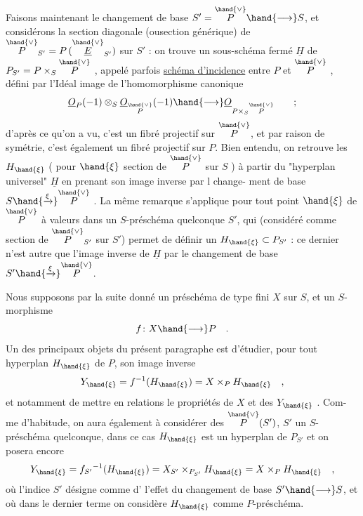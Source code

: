 
Faisons maintenant le changement de base $S'=\overset{\hand{\vee}}{P}\hand{\longrightarrow} S$, et considérons
la section diagonale (ousection générique) de $\overset{\hand{\vee}}{P}_{S'} = P\,(\overset{\hand{\vee}}{\underline{E}}_{S'})$ sur $S'$ :
on trouve un sous-schéma fermé $\underline{H}$ de $P_{S'} = P\times_S\overset{\hand{\vee}}{P}$ , appelé parfois
\uline{schéma d'incidence} entre $P$ et $\overset{\hand{\vee}}{P}$ , défini par l'Idéal image de
l'homomorphisme canonique
\[ \underline{O}_P(-1)\otimes_S\underline{O}_{\overset{\hand{\vee}}{P}}(-1)\hand{\longrightarrow} \underline{O}_{P\times_S\overset{\hand{\vee}}{P}} \qquad ; \]
d'après ce qu'on a vu, c'est un fibré projectif sur $\overset{\hand{\vee}}{P}$, et par raison de
symétrie, c'est également un fibré projectif sur $P$. Bien entendu, on
retrouve les $H_{\hand{\xi}}$ ( pour $\hand{\xi}$ section de $\overset{\hand{\vee}}{P}$ sur $S$ )\hand{,} à partir
du "hyperplan universel" $\underline{H}$\hand{,} en prenant son image inverse par l change-%
ment de base $S\hand{\xrightarrow{\xi}}\overset{\hand{\vee}}{P}$ . La même remarque s'applique pour tout point
$\hand{\xi}$ de $\overset{\hand{\vee}}{P}$ à valeurs dans un $S$-préschéma quelconque $S'$, qui (considéré comme
section de $\overset{\hand{\vee}}{P}_{S'}$ sur $S'$) permet de définir un $H_{\hand{\xi}}\subset P_{S'}$ : ce dernier n'est
autre que l'image inverse de $\underline{H}$ par le changement de base $S'\hand{\xrightarrow{\xi}}\overset{\hand{\vee}}{P}$.

Nous supposons par la suite donné un préschéma de type fini $X$ sur $S$,
et un $S$-morphisme
\[ f\colon X\hand{\longrightarrow} P \quad . \]
\margin{$|$}Un des principaux objets du présent paragraphe est d'étudier, pour tout
\margin{$|$}hyperplan $H_{\hand{\xi}}$ de $P$,  son image inverse
\[ Y_{\hand{\xi}} = f^{-1}(H_{\hand{\xi}}) = X\times_P H_{\hand{\xi}} \quad , \]
et notamment de mettre en relations le propriétés de $X$ et des $Y_{\hand{\xi}}$ . Com-%
me d'habitude, on aura également à considérer des $\overset{\hand{\vee}}{P}(S')$, $S'$ 
un $S$-préschéma quelconque, dans ce cas $H_{\hand{\xi}}$ est un hyperplan de $P_{S'}$ \hand{,}
et on posera encore
\[ Y_{\hand{\xi}} = f_{S'}{}^{-1}(H_{\hand{\xi}}) = X_{S'}\times_{P_{S'}}H_{\hand{\xi}} = X\times_P H_{\hand{\xi}} \quad , \]
où l'indice $S'$ désigne comme d'  l'effet du changement de base
$S'\hand{\longrightarrow} S$, et où dans le dernier terme on considère $H_{\hand{\xi}}$ comme $P$-préschéma.


